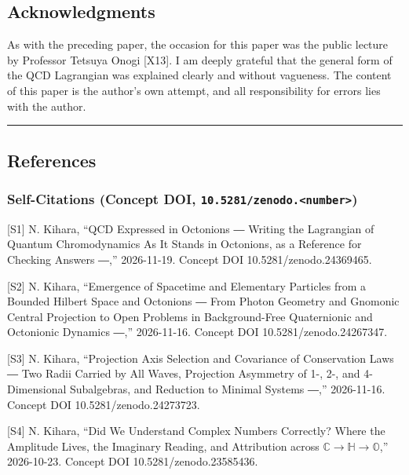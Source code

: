 \documentclass[
  a4paper,
]{article}
\begin{document}
\subsection{Acknowledgments}\label{acknowledgments}

As with the preceding paper, the occasion for this paper was the public
lecture by Professor Tetsuya Onogi {[}X13{]}. I am deeply grateful that
the general form of the QCD Lagrangian was explained clearly and without
vagueness. The content of this paper is the author's own attempt, and
all responsibility for errors lies with the author.

\begin{center}\rule{0.5\linewidth}{0.5pt}\end{center}

\subsection{References}\label{references}

\subsubsection{\texorpdfstring{Self-Citations (Concept DOI,
\texttt{10.5281/zenodo.\textless{}number\textgreater{}})}{Self-Citations (Concept DOI, 10.5281/zenodo.\textless number\textgreater)}}\label{self-citations-concept-doi-10.5281zenodo.number}

{[}S1{]} N. Kihara, ``QCD Expressed in Octonions ― Writing the
Lagrangian of Quantum Chromodynamics As It Stands in Octonions, as a
Reference for Checking Answers ―,'' 2026-11-19. Concept DOI
10.5281/zenodo.24369465.

{[}S2{]} N. Kihara, ``Emergence of Spacetime and Elementary Particles
from a Bounded Hilbert Space and Octonions ― From Photon Geometry and
Gnomonic Central Projection to Open Problems in Background-Free
Quaternionic and Octonionic Dynamics ―,'' 2026-11-16. Concept DOI
10.5281/zenodo.24267347.

{[}S3{]} N. Kihara, ``Projection Axis Selection and Covariance of
Conservation Laws ― Two Radii Carried by All Waves, Projection Asymmetry
of 1-, 2-, and 4-Dimensional Subalgebras, and Reduction to Minimal
Systems ―,'' 2026-11-16. Concept DOI 10.5281/zenodo.24273723.

{[}S4{]} N. Kihara, ``Did We Understand Complex Numbers Correctly? Where
the Amplitude Lives, the Imaginary Reading, and Attribution across
\(\mathbb{C} \to \mathbb{H} \to \mathbb{O}\),'' 2026-10-23. Concept DOI
10.5281/zenodo.23585436.
\end{document}
